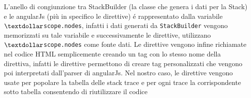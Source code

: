 L'anello di congiunzione tra StackBuilder (la classe che genera i dati per la Stack) e le angularJs (più in specifico le direttive) 
é rappresentato dalla variabile \texttt{$\textdollar$scope.nodes}, infatti i dati generati da \texttt{StackBuilder} vengono memorizzati su tale variabile e successivamente le direttive, utilizzano \texttt{$\textdollar$scope.nodes} come fonte dati. Le direttive vengono infine richiamate nel codice HTML semplicemente creando un 
tag con lo stesso nome della direttiva, infatti le direttive permettono di creare 
tag personalizzati che vengono poi interpretati dall'parser di angularJs. 
Nel nostro caso, le direttive vengono usate per popolare la tabella delle stack trace 
e per ogni trace la corrispondente sotto tabella consentendo di riutilizzare il codice 